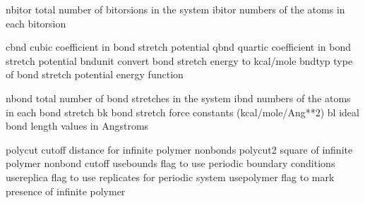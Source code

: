 \documentclass[letterpaper,11pt,english]{sphinxmanual}
\begin{document}

\begin{sphinxVerbatim}[commandchars=\\\{\}]
nbitor          total number of bitorsions in the system
ibitor          numbers of the atoms in each bitorsion
\end{sphinxVerbatim}


\begin{sphinxVerbatim}[commandchars=\\\{\}]
cbnd            cubic coefficient in bond stretch potential
qbnd            quartic coefficient in bond stretch potential
bndunit         convert bond stretch energy to kcal/mole
bndtyp          type of bond stretch potential energy function
\end{sphinxVerbatim}


\begin{sphinxVerbatim}[commandchars=\\\{\}]
nbond           total number of bond stretches in the system
ibnd            numbers of the atoms in each bond stretch
bk              bond stretch force constants (kcal/mole/Ang**2)
bl              ideal bond length values in Angstroms
\end{sphinxVerbatim}


\begin{sphinxVerbatim}[commandchars=\\\{\}]
polycut         cutoff distance for infinite polymer nonbonds
polycut2        square of infinite polymer nonbond cutoff
use\PYGZus{}bounds      flag to use periodic boundary conditions
use\PYGZus{}replica     flag to use replicates for periodic system
use\PYGZus{}polymer     flag to mark presence of infinite polymer
\end{sphinxVerbatim}

\end{document}
